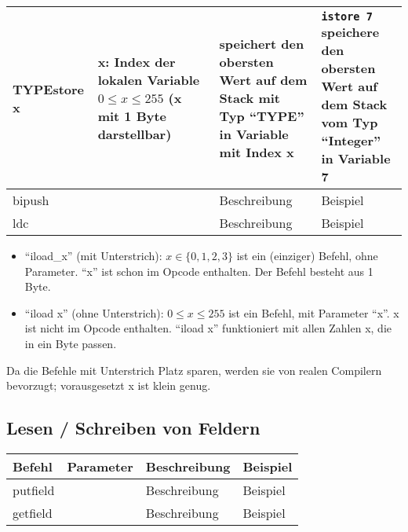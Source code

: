 \begin{table}[h]
\begin{tabular}{l|l|l|l}
		\textbf{TYPE}store x	& \multlineTable{x: Index der lokalen\\ Variable $0 \leq x \leq 255$\\ (x mit 1 Byte darstellbar) }	&	\multlineTable{speichert den obersten Wert auf dem\\ Stack mit Typ \enquote{TYPE} in Variable\\ mit Index x}	& \multlineTable{\texttt{istore 7}\\ speichere den obersten Wert auf\\ dem Stack vom Typ \enquote{Integer}\\ in Variable 7}	\\ \hline	
		
		bipush & \open & Beschreibung & Beispiel \\ \hline	
		
		ldc & \open  & Beschreibung & Beispiel \\ \hline
	\end{tabular}
\end{table}
\begin{itemize}
	\item \enquote{iload\_x} (mit Unterstrich): $x \in \{ 0,1,2,3 \}$ ist ein (einziger) Befehl, ohne Parameter. \enquote{x} ist schon im Opcode enthalten. Der Befehl besteht aus 1 Byte.
	\item \enquote{iload x} (ohne Unterstrich): $0 \leq x \leq 255$ ist ein Befehl, mit Parameter \enquote{x}. x ist nicht im Opcode enthalten. \enquote{iload x} funktioniert mit allen Zahlen x, die in ein Byte passen.
\end{itemize}
Da die Befehle mit Unterstrich Platz sparen, werden sie von realen Compilern bevorzugt; vorausgesetzt x ist klein genug.

\subsection{Lesen / Schreiben von Feldern}
\begin{table}[h]
	\centering
	\label{my-label}
	\begin{tabular}{l|l|l|l}
		Befehl & Parameter & Beschreibung & Beispiel \\ \hline
		
		putfield & \open & Beschreibung & Beispiel \\ \hline	
		
		getfield & \open & Beschreibung & Beispiel \\ \hline		
		
	\end{tabular}
\end{table}

